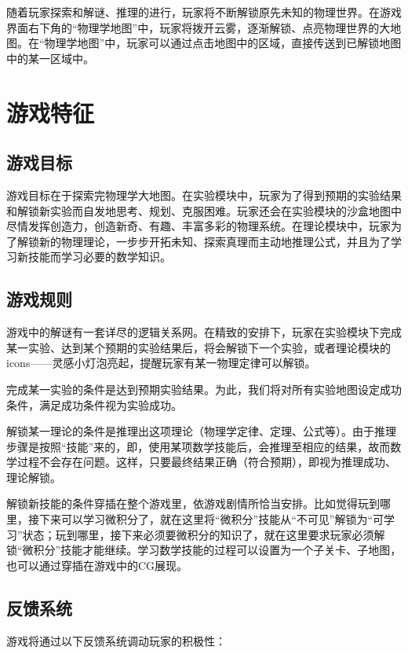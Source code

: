 \documentclass{tstextbook}
\begin{document}
随着玩家探索和解谜、推理的进行，玩家将不断解锁原先未知的物理世界。在游戏界面右下角的“物理学地图”中，玩家将拨开云雾，逐渐解锁、点亮物理世界的大地图。在“物理学地图”中，玩家可以通过点击地图中的区域，直接传送到已解锁地图中的某一区域中。



\section{游戏特征}

\subsection{游戏目标}

游戏目标在于探索完物理学大地图。在实验模块中，玩家为了得到预期的实验结果和解锁新实验而自发地思考、规划、克服困难。玩家还会在实验模块的沙盒地图中尽情发挥创造力，创造新奇、有趣、丰富多彩的物理系统。在理论模块中，玩家为了解锁新的物理理论，一步步开拓未知、探索真理而主动地推理公式，并且为了学习新技能而学习必要的数学知识。

\subsection{游戏规则}

游戏中的解谜有一套详尽的逻辑关系网。在精致的安排下，玩家在实验模块下完成某一实验、达到某个预期的实验结果后，将会解锁下一个实验，或者理论模块的icons——灵感小灯泡亮起，提醒玩家有某一物理定律可以解锁。

完成某一实验的条件是达到预期实验结果。为此，我们将对所有实验地图设定成功条件，满足成功条件视为实验成功。

解锁某一理论的条件是推理出这项理论（物理学定律、定理、公式等）。由于推理步骤是按照“技能”来的，即，使用某项数学技能后，会推理至相应的结果，故而数学过程不会存在问题。这样，只要最终结果正确（符合预期），即视为推理成功、理论解锁。

解锁新技能的条件穿插在整个游戏里，依游戏剧情所恰当安排。比如觉得玩到哪里，接下来可以学习微积分了，就在这里将“微积分”技能从“不可见”解锁为“可学习”状态；玩到哪里，接下来必须要微积分的知识了，就在这里要求玩家必须解锁“微积分”技能才能继续。学习数学技能的过程可以设置为一个子关卡、子地图，也可以通过穿插在游戏中的CG展现。

\subsection{反馈系统}

游戏将通过以下反馈系统调动玩家的积极性：
\end{document}
